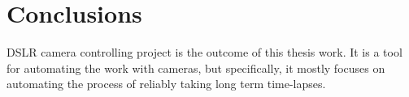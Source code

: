 \section*{Conclusions}

DSLR camera controlling project is the outcome of this thesis work. It is a tool for automating the work with cameras, but specifically, it mostly focuses on automating the process of reliably taking long term time-lapses.

\clearpage
